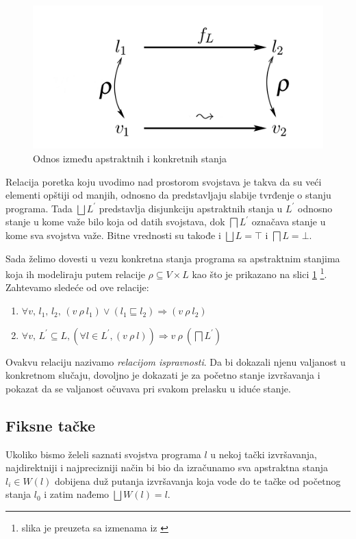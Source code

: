 \begin{figure}
\begin{center}
\includegraphics[scale=0.5]{Rho.png}
\end{center}
\caption{Odnos između apstraktnih i konkretnih stanja}
\label{fig:Rho}
\end{figure}

Relacija poretka koju uvodimo nad prostorom svojstava je takva da su veći elementi opštiji od manjih, odnosno da predstavljaju slabije tvrđenje o stanju programa. Tada $\bigsqcup L^{\prime}$ predstavlja disjunkciju apstraktnih stanja u $L^{\prime}$ odnosno stanje u kome važe bilo koja od datih svojstava, dok $\bigsqcap L^{\prime}$ označava stanje u kome sva svojstva važe. Bitne vrednosti su takođe i $\bigsqcup L = \top$ i $\bigsqcap L = \bot$.

Sada želimo dovesti u vezu konkretna stanja programa sa apstraktnim stanjima koja ih modeliraju putem relacije $\rho \subseteq V \times L$ kao što je prikazano na slici \ref{fig:Rho} \footnote{slika je preuzeta sa izmenama iz \cite{salcianu}}. Zahtevamo sledeće od ove relacije:
\begin{enumerate}
\item $\forall v,\, l_{1},\, l_{2},\, (v\: \rho \: l_{1}) \vee (l_{1} \sqsubseteq l_{2}) \Rightarrow (v\: \rho \: l_{2})$
\item $\forall v,\, L^{\prime} \subseteq L, (\forall l \in L^{\prime}, 	(v\: \rho \: l)) \Rightarrow v\: \rho \: (\bigsqcap L^{\prime})$
\end{enumerate}

Ovakvu relaciju nazivamo \emph{relacijom ispravnosti}. Da bi dokazali njenu valjanost u konkretnom slučaju, dovoljno je dokazati je za početno stanje izvršavanja i pokazat da se valjanost očuvava pri svakom prelasku u iduće stanje. 


\subsection{Fiksne tačke}
Ukoliko bismo želeli saznati svojstva programa $l$ u nekoj tački izvršavanja, najdirektniji i najprecizniji način bi bio da izračunamo sva apstraktna stanja $l_{i} \in W(l)$ dobijena duž putanja izvršavanja koja vode do te tačke od početnog stanja $l_{0}$ i zatim nađemo $\bigsqcup W(l) = l$. 


